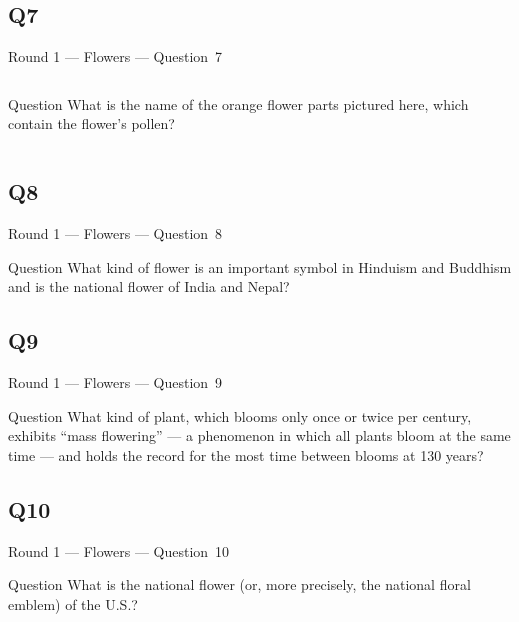 \documentclass[11pt]{beamer}
\begin{document}
\subsection*{Q7}
\begin{frame}[t]{Round 1 --- Flowers --- \mbox{Question 7}}
\vspace{-0.5em}
\begin{columns}[T,totalwidth=\linewidth]
\begin{column}{0.32\linewidth}
\begin{block}{Question}
What is the name of the orange flower parts pictured here, which contain the flower's pollen?
\end{block}
\end{column}
\begin{column}{0.65\linewidth}
\begin{center}
\texttt{[image: \{Images/anther]}.jpg}
\end{center}
\end{column}
\end{columns}
\end{frame}
\subsection*{Q8}
\begin{frame}[t]{Round 1 --- Flowers --- \mbox{Question 8}}
\vspace{-0.5em}
\begin{block}{Question}
What kind of flower is an important symbol in Hinduism and Buddhism and is the national flower of India and Nepal?
\end{block}
\end{frame}
\subsection*{Q9}
\begin{frame}[t]{Round 1 --- Flowers --- \mbox{Question 9}}
\vspace{-0.5em}
\begin{block}{Question}
What kind of plant, which blooms only once or twice per century, exhibits ``mass flowering'' --- a phenomenon in which all plants bloom at the same time --- and holds the record for the most time between blooms at 130 years?
\end{block}
\end{frame}
\subsection*{Q10}
\begin{frame}[t]{Round 1 --- Flowers --- \mbox{Question 10}}
\vspace{-0.5em}
\begin{block}{Question}
What is the national flower (or, more precisely, the national floral emblem) of the U.S.?
\end{block}
\end{frame}
\end{document}

